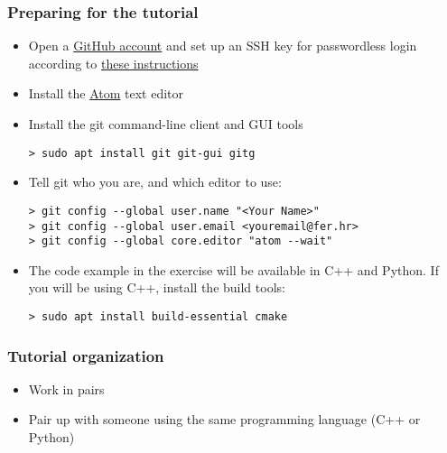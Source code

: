 \begin{frame}[fragile]

\frametitle{Preparing for the tutorial}
	
\begin{itemize}
	\item  Open a \href{https://github.com/join?source=header-home}{GitHub account} and set up an SSH key for passwordless login according to \href{https://help.github.com/articles/adding-a-new-ssh-key-to-your-github-account/}{these instructions}
	\item Install the \href{https://atom.io/}{Atom} text editor
	\item Install the git command-line client and GUI tools
	\begin{verbatim}
> sudo apt install git git-gui gitg
	\end{verbatim}
	\item Tell git who you are, and which editor to use:
	\begin{verbatim}
> git config --global user.name "<Your Name>"
> git config --global user.email <youremail@fer.hr>
> git config --global core.editor "atom --wait"
	\end{verbatim}
	\item The code example in the exercise will be available in C++ and Python. If you will be using C++, install the build tools:
	\begin{verbatim}
> sudo apt install build-essential cmake
	\end{verbatim}
\end{itemize}

\end{frame}


\begin{frame}

\frametitle{Tutorial organization}
	
\begin{itemize}
	\item Work in pairs
	\item Pair up with someone using the same programming language (C++ or Python)
\end{itemize}
	
\end{frame}

